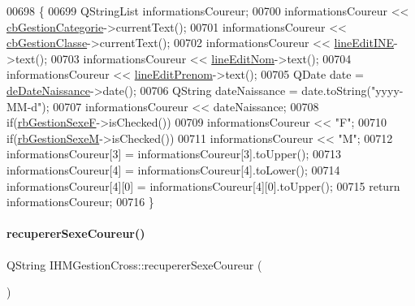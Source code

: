 \begin{DoxyCode}
00698 \{
00699     QStringList informationsCoureur;
00700     informationsCoureur << \hyperlink{class_i_h_m_gestion_cross_a60cdc44c61bcd4e1e189c8de5556b89e}{cbGestionCategorie}->currentText();
00701     informationsCoureur << \hyperlink{class_i_h_m_gestion_cross_af734c4b13942dd83fbbd0355e3728c9f}{cbGestionClasse}->currentText();
00702     informationsCoureur << \hyperlink{class_i_h_m_gestion_cross_ab6c32fd079f81c4fa0b9ec0b4ef9bb61}{lineEditINE}->text();
00703     informationsCoureur << \hyperlink{class_i_h_m_gestion_cross_a633102626c5dedd575b51a1ba5c6e708}{lineEditNom}->text();
00704     informationsCoureur << \hyperlink{class_i_h_m_gestion_cross_a7bea7529f01cf8ca8f365d418aae52d5}{lineEditPrenom}->text();
00705     QDate date = \hyperlink{class_i_h_m_gestion_cross_a1c63c5c91be88aef13d2582e48dff7d0}{deDateNaissance}->date();
00706     QString dateNaissance = date.toString(\textcolor{stringliteral}{"yyyy-MM-d"});
00707     informationsCoureur << dateNaissance;
00708     \textcolor{keywordflow}{if}(\hyperlink{class_i_h_m_gestion_cross_a4474ef47310eb3511befdf1beaa18b56}{rbGestionSexeF}->isChecked())
00709         informationsCoureur << \textcolor{stringliteral}{"F"};
00710     \textcolor{keywordflow}{if}(\hyperlink{class_i_h_m_gestion_cross_a7d471a7f96862dcd302f7f8cc52dfea4}{rbGestionSexeM}->isChecked())
00711         informationsCoureur << \textcolor{stringliteral}{"M"};
00712     informationsCoureur[3] = informationsCoureur[3].toUpper();
00713     informationsCoureur[4] = informationsCoureur[4].toLower();
00714     informationsCoureur[4][0] = informationsCoureur[4][0].toUpper();
00715     \textcolor{keywordflow}{return} informationsCoureur;
00716 \}
\end{DoxyCode}
\mbox{\label{class_i_h_m_gestion_cross_a7e1cdc8b3b01f2f2f666f80bf1cc9f5a}} 
\paragraph{\texorpdfstring{recuperer\+Sexe\+Coureur()}{recupererSexeCoureur()}}
{\footnotesize\ttfamily Q\+String I\+H\+M\+Gestion\+Cross\+::recuperer\+Sexe\+Coureur (\begin{DoxyParamCaption}{ }\end{DoxyParamCaption})\hspace{0.3cm}{\ttfamily [private]}}



